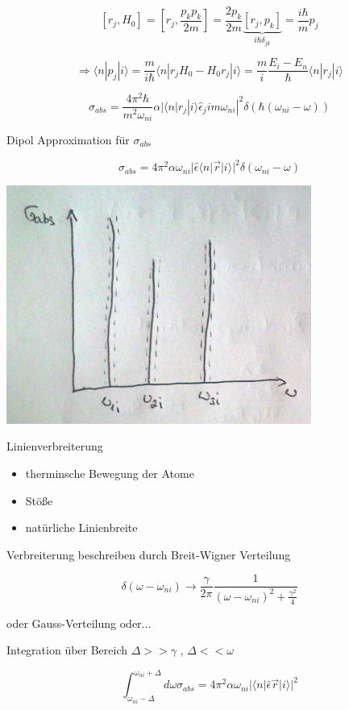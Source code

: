 \[[r_{j},H_0]=[r_{j},\frac{p_kp_k}{2m}] = \frac{2p_k}{2m}\underbrace{[r_{j},p_k]}_{i\hbar\delta_{jk}} = \frac{i\hbar}{m}p_j\]

\[\Rightarrow \langle n|p_j|i\rangle = \frac{m}{i\hbar}\langle n|r_jH_0-H_0r_j|i\rangle =\frac{m}{i}\frac{E_i-E_n}{\hbar}\langle n|r_j|i\rangle \]

\[\sigma_{abs} = \frac{4\pi^2\hbar}{m^2\omega_{ni}}\alpha|\langle n|r_j|i\rangle \hat \epsilon_j im\omega_{ni}|^2\delta(\hbar(\omega_{ni}-\omega))\]

Dipol Approximation für \(\sigma_{abs}\)

\[\boxed{\sigma_{abs}=4\pi^2\alpha\omega_{ni}|\hat\epsilon\langle n|\vec r|i\rangle|^2\delta(\omega_{ni}-\omega)  }\]

\includegraphics[width=0.75\textwidth]{kap03_12.png}

Linienverbreiterung
\begin{itemize}
\item therminsche Bewegung der Atome
\item Stöße
\item natürliche Linienbreite
\end{itemize}

Verbreiterung beschreiben durch Breit-Wigner Verteilung

\[ \delta(\omega-\omega_{ni}) \rightarrow \frac{\gamma}{2\pi}\frac{1}{(\omega-\omega_{ni})^2+\frac{\gamma^2}{4}}\]

oder Gauss-Verteilung oder...


Integration über Bereich \(\Delta > >\gamma\) , \(\Delta << \omega\)

\[\int_{\omega_{ni}-\Delta}^{\omega_{ni}+\Delta}d\omega\sigma_{abs} = 4\pi^2\alpha \omega_{ni}|\langle n|\hat\epsilon \vec r|i \rangle |^2\]

